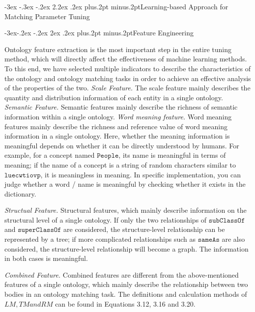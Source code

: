 \documentclass[twoside]{article}
\makeatletter
\def\section{\@startsection{section}{1}{\z@}%
 {-3ex \@plus -.3ex \@minus -.2ex}%
 {2.2ex \@plus.2ex}%
{\normalfont\normalsize\protect\baselineskip=14.5pt plus.2pt minus.2pt\bfseries}}
\def\subsection{\@startsection{subsection}{2}{\z@}%
 {-3ex\@plus -.2ex \@minus -.2ex}%
 {2ex \@plus.2ex}%
{\normalfont\normalsize\protect\baselineskip=12.5pt plus.2pt minus.2pt\bfseries}}
\makeatother
\begin{document}
\begin{multicols}{2}
\section{Learning-based Approach for Matching Parameter Tuning}

\subsection{Feature Engineering}

Ontology feature extraction is the most important step in the entire tuning method, which will directly affect the effectiveness of machine learning methods. To this end, we have selected multiple indicators to describe the characteristics of the ontology and ontology matching tasks in order to achieve an effective analysis of the properties of the two.
{\it Scale Feature.} The scale feature mainly describes the quantity and distribution information of each entity in a single ontology.
{\it Semantic Feature.} Semantic features mainly describe the richness of semantic information within a single ontology.
{\it Word meaning feature.} Word meaning features mainly describe the richness and reference value of word meaning information in a single ontology. 
Here, whether the meaning information is meaningful depends on whether it can be directly understood by humans. 
For example, for a concept named $\texttt{People}$, its name is meaningful in terms of meaning; if the name of a concept is a string of random characters similar to $\texttt{luecwtiovp}$, it is meaningless in meaning. 
In specific implementation, you can judge whether a word / name is meaningful by checking whether it exists in the dictionary.

{\it Structual Feature.}  Structural features, which mainly describe information on the structural level of a single ontology. 
If only the two relationships of $\texttt{subClassOf}$ and $\texttt{superClassOf}$ are considered, the structure-level relationship can be represented by a tree; if more complicated relationships such as $\texttt{sameAs}$ are also considered, the structure-level relationship will become a graph. The information in both cases is meaningful.

{\it Combined Feature.} Combined features are different from the above-mentioned features of a single ontology, which mainly describe the relationship between two bodies in an ontology matching task. The definitions and calculation methods of $LM, TM and RM$ can be found in Equations 3.12, 3.16 and 3.20.


\end{multicols}
\end{document}

